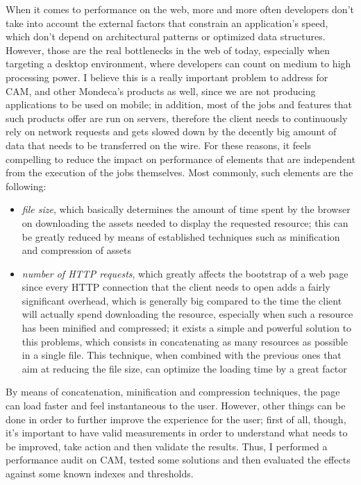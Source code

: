 \documentclass[12pt,svgnames]{memoir}
\begin{document}
When it comes to performance on the web, more and more often developers
don't take into account the external factors that constrain an
application's speed, which don't depend on architectural patterns or
optimized data structures. However, those are the real bottlenecks in
the web of today, especially when targeting a desktop environment, where
developers can count on medium to high processing power. I believe this
is a really important problem to address for CAM, and other Mondeca's
products as well, since we are not producing applications to be used on
mobile; in addition, most of the jobs and features that such products
offer are run on servers, therefore the client needs to continuously
rely on network requests and gets slowed down by the decently big amount
of data that needs to be transferred on the wire. For these reasons, it
feels compelling to reduce the impact on performance of elements that
are independent from the execution of the jobs themselves. Most
commonly, such elements are the following:

\begin{itemize}
\itemsep1pt\parskip0pt
\item
  \emph{file size}, which basically determines the amount of time spent
  by the browser on downloading the assets needed to display the
  requested resource; this can be greatly reduced by means of
  established techniques such as minification and compression of assets
\item
  \emph{number of HTTP requests}, which greatly affects the bootstrap of
  a web page since every HTTP connection that the client needs to open
  adds a fairly significant overhead, which is generally big compared to
  the time the client will actually spend downloading the resource,
  especially when such a resource has been minified and compressed; it
  exists a simple and powerful solution to this problems, which consists
  in concatenating as many resources as possible in a single file. This
  technique, when combined with the previous ones that aim at reducing
  the file size, can optimize the loading time by a great factor
\end{itemize}

By means of concatenation, minification and compression techniques, the
page can load faster and feel instantaneous to the user. However, other
things can be done in order to further improve the experience for the
user; first of all, though, it's important to have valid measurements in
order to understand what needs to be improved, take action and then
validate the results. Thus, I performed a performance audit on CAM,
tested some solutions and then evaluated the effects against some known
indexes and thresholds.
\end{document}
